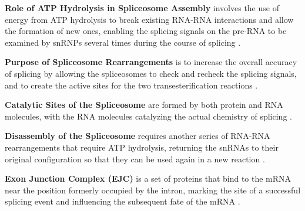\textbf{Role of ATP Hydrolysis in Spliceosome Assembly} involves the use of energy from ATP hydrolysis to break existing RNA-RNA interactions and allow the formation of new ones, enabling the splicing signals on the pre-RNA to be examined by snRNPs several times during the course of splicing \cite*{L1-Chapter6}.

\textbf{Purpose of Spliceosome Rearrangements} is to increase the overall accuracy of splicing by allowing the spliceosomes to check and recheck the splicing signals, and to create the active sites for the two transesterification reactions \cite*{L1-Chapter6}.

\textbf{Catalytic Sites of the Spliceosome} are formed by both protein and RNA molecules, with the RNA molecules catalyzing the actual chemistry of splicing \cite*{L1-Chapter6}.

\textbf{Disassembly of the Spliceosome} requires another series of RNA-RNA rearrangements that require ATP hydrolysis, returning the snRNAs to their original configuration so that they can be used again in a new reaction \cite*{L1-Chapter6}.

\textbf{Exon Junction Complex (EJC)} is a set of proteins that bind to the mRNA near the position formerly occupied by the intron, marking the site of a successful splicing event and influencing the subsequent fate of the mRNA \cite*{L1-Chapter6}.



